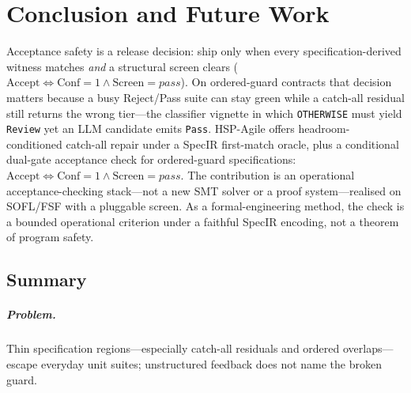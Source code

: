 
\chapter{Conclusion and Future Work}
\label{ch:conclusion}

Acceptance safety is a release decision: ship only when every
specification-derived witness matches \emph{and} a structural screen clears
($\mathrm{Accept}\Leftrightarrow\mathrm{Conf}{=}1\wedge\mathrm{Screen}{=}
\mathit{pass}$).
On ordered-guard contracts that decision matters because a busy Reject/Pass
suite can stay green while a catch-all residual still returns the wrong
tier---the classifier vignette in which \texttt{OTHERWISE} must yield
\texttt{Review} yet an LLM candidate emits \texttt{Pass}.
HSP-Agile offers headroom-conditioned catch-all repair under a SpecIR
first-match oracle, plus a conditional dual-gate acceptance check for
ordered-guard specifications:
$\mathrm{Accept}\Leftrightarrow\mathrm{Conf}{=}1\wedge\mathrm{Screen}{=}\mathit{pass}$.
The contribution is an operational acceptance-checking stack---not a new SMT
solver or a proof system---realised on SOFL/FSF with a pluggable screen.
As a formal-engineering method, the check is a bounded operational criterion
under a faithful SpecIR encoding, not a theorem of program safety.


\section{Summary}
\label{sec:conc:summary}

\paragraph{Problem.}
Thin specification regions---especially catch-all residuals and ordered
overlaps---escape everyday unit suites; unstructured feedback does not name
the broken guard.

